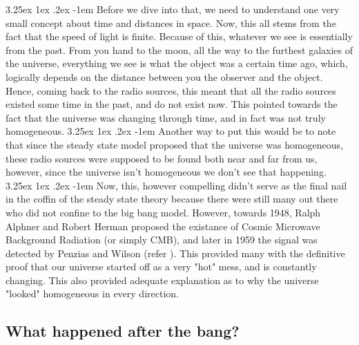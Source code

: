 \documentclass[a4paper,twoside,11pt]{article}
\makeatletter
\numberwithin{equation}{section}
\renewcommand\paragraph{\@startsection{paragraph}{5}{\z@}%
  {3.25ex \@plus1ex \@minus.2ex}%
  {-1em}%
  {\normalfont\normalsize\bfseries}}
\makeatother
\begin{document}
\paragraph{}
Before we dive into that, we need to understand one very small concept about time and distances in space. Now, this all stems from the fact that the speed of light is finite. Because of this, whatever we see is essentially from the past. From you hand to the moon, all the way to the furthest galaxies of the universe, everything we see is what the object was a certain time ago, which, logically depends on the distance between you the observer and the object. Hence, coming back to the radio sources, this meant that all the radio sources existed some time in the past, and do not exist now. This pointed towards the fact that the universe was changing through time, and in fact was not truly homogeneous. 
\paragraph{}
Another way to put this would be to note that since the steady state model proposed that the universe was homogeneous, these radio sources were supposed to be found both near and far from us, however, since the universe isn't homogeneous we don't see that happening. 
\paragraph{}
Now, this, however compelling didn't serve as the final nail in the coffin of the steady state theory because there were still many out there who did not confine to the big bang model. However, towards 1948, Ralph Alphner and Robert Herman proposed the existance of Cosmic Microwave Background Radiation (or simply CMB), and later in 1959 the signal was detected by Penzias and Wilson (refer \cite{Wiki_CMB}). This provided many with the definitive proof that our universe started off as a very "hot" mess, and is constantly changing. This also provided adequate explanation as to why the universe "looked" homogeneous in every direction. 
\subsection{What happened after the bang?}
\end{document}
